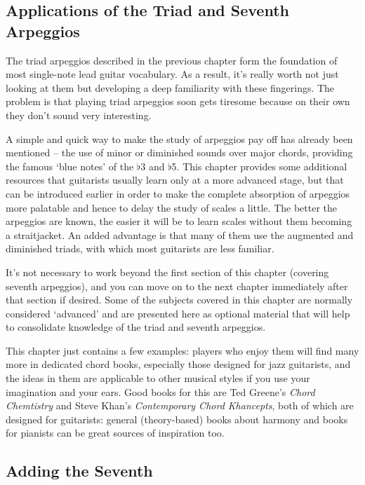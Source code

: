 \documentclass[english]{./gbook}
\newcommand{\titlebreak}{}
\begin{document}
\begin{large}
\chapter{\mbox{Applications} \mbox{of} \mbox{the} \titlebreak \mbox{Triad} \mbox{and} \mbox{Seventh} \titlebreak \mbox{Arpeggios}}

The triad arpeggios described in the previous chapter form the foundation of most single-note lead guitar vocabulary. As a result, it's really worth not just looking at them but developing a deep familiarity with these fingerings. The problem is that playing triad arpeggios soon gets tiresome because on their own they don't sound very interesting.

A simple and quick way to make the study of arpeggios pay off has already been mentioned -- the  use of minor or diminished sounds over major chords, providing the famous `blue notes' of the $\flat$3 and $\flat$5. This chapter provides some additional resources that guitarists usually learn only at a more advanced stage, but that can be introduced earlier in order to make the complete absorption of arpeggios more palatable and hence to delay the study of scales a little. The better the arpeggios are known, the easier it will be to learn scales without them becoming a straitjacket. An added advantage is that many of them use the augmented and diminished triads, with which most guitarists are less familiar. 

It's not necessary to work beyond the first section of this chapter (covering seventh arpeggios), and you can move on to the next chapter immediately after that section if desired. Some of the subjects covered in this chapter are normally considered `advanced' and are presented here as optional material that will help to consolidate knowledge of the triad and seventh arpeggios.

This chapter just contains a few examples: players who enjoy them will find many more in dedicated chord books, especially those designed for jazz guitarists, and the ideas in them are applicable to other musical styles if you use your imagination and your ears. Good books for this are Ted Greene's \emph{Chord Chemtistry} and Steve Khan's \emph{Contemporary Chord Khancepts}, both of which are designed for guitarists: general (theory-based) books about harmony and books for pianists can be great sources of inspiration too.

\section{Adding the Seventh}


\end{large}
\end{document}
